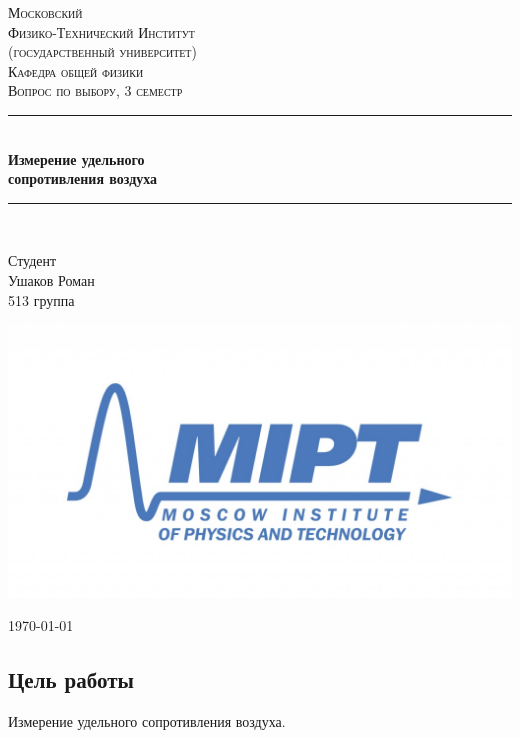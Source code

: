 \documentclass[a4paper, 12pt]{article}
\newenvironment{bottompar}{\par\vspace*{\fill}}{\clearpage}
\begin{document}
\begin{titlepage}
\newcommand{\HRule}{\rule{\linewidth}{0.5mm}} %

\center %
 
\textsc{\LARGE Московский\\[-0.2cm]Физико-Технический Институт\\[0.1cm]\large (государственный университет)}\\[1.5cm] %
\textsc{\Large Кафедра общей физики}\\[0.1cm] %
\textsc{\large Вопрос по выбору, 3 семестр}\\[0.5cm] %

\HRule
\\[0.8cm]
{ \huge \bfseries Измерение удельного\\[0.3cm] сопротивления воздуха}
\\[0.8cm] %
\HRule
\\[1.5cm]

\begin{flushleft} \large
	\textsf{Студент}\\[0.1cm]
	Ушаков Роман \\
	513 группа
\end{flushleft}

\begin{bottompar}
	\begin{center}
		\includegraphics[width = 80 mm]{logo.jpg}
	\end{center}
	{\large \today}

\end{bottompar}
\vfill
\end{titlepage}

\subsection*{Цель работы}
Измерение удельного сопротивления воздуха.
\end{document}
